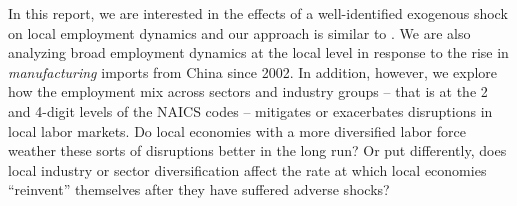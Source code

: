 \documentclass[onehalfspacing,11pt]{article}
\begin{document}
In this report, we are interested in the effects of a well-identified exogenous shock on local employment dynamics and our approach is similar to \cite{Bloom:2019}. We are also analyzing broad employment dynamics at the local level in response to the rise in {\it manufacturing} imports from China since 2002. In addition, however, we explore how the employment mix across sectors and industry groups -- that is at the 2 and 4-digit levels of the NAICS codes -- mitigates or exacerbates disruptions in local labor markets.
%
%
%
Do local economies with a more diversified labor force weather these sorts of disruptions better in the long run? Or put differently, does local industry or sector diversification affect the rate at which local economies ``reinvent'' themselves after they have suffered adverse shocks?
\end{document}
